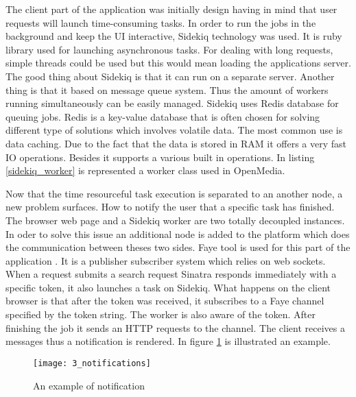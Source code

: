 The client part of the application was initially design having in mind that user requests will launch time-consuming tasks. In order to run the jobs in the background and keep the UI interactive, Sidekiq technology was used\cite{sidekiq}. It is ruby library used for launching asynchronous tasks. For dealing with long requests, simple threads could be used but this would mean loading the applications server. The good thing about Sidekiq is that it can run on a separate server. Another thing is that it based on message queue system. Thus the amount of workers running simultaneously can be easily managed. Sidekiq uses Redis database for queuing jobs. Redis is a key-value database\cite{redis} that is often chosen for solving different type of solutions which involves volatile data. The most common use is data caching. Due to the fact that the data is stored in RAM it offers a very fast IO operations. Besides it supports a various built in operations. In listing \ref{sidekiq_worker} is represented a worker class used in OpenMedia.



Now that the time resourceful task execution is separated to an another node, a new problem surfaces. How to notify the user that a specific task has finished. The browser web page and a Sidekiq worker are two totally decoupled instances. In oder to solve this issue an additional node is added to the platform which does the communication between theses two sides. Faye tool is used for this part of the application \cite{faye}. It is a publisher subscriber system which relies on web sockets. When a request submits a search request Sinatra responds immediately with a specific token, it also launches a task on Sidekiq. What happens on the client browser is that after the token was received, it subscribes to a Faye channel specified by the token string. The worker is also aware of the token. After finishing the job it sends an HTTP requests to the channel. The client receives a messages thus a notification is rendered. In figure \ref{notifications} is illustrated an example.

\begin{figure}[!ht]
\centering
\texttt{[image: 3\_notifications]}
\caption{An example of notification}\label{notifications}
\end{figure}


\clearpage